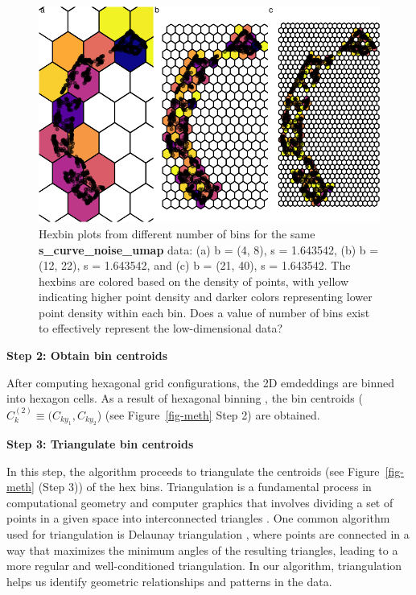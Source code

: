 \documentclass[
  12pt]{article}
\begin{document}
\begin{figure}[H]

{\centering \includegraphics{paper_files/figure-pdf/fig-binsize-1.pdf}

}

\caption{\label{fig-binsize}Hexbin plots from different number of bins
for the same \textbf{s\_curve\_noise\_umap} data: (a) b = (4, 8), s =
1.643542, (b) b = (12, 22), s = 1.643542, and (c) b = (21, 40), s =
1.643542. The hexbins are colored based on the density of points, with
yellow indicating higher point density and darker colors representing
lower point density within each bin. Does a value of number of bins
exist to effectively represent the low-dimensional data?}

\end{figure}

\textbf{Step 2: Obtain bin centroids}

After computing hexagonal grid configurations, the 2D emdeddings are
binned into hexagon cells. As a result of hexagonal binning , the bin
centroids (\(C_k^{(2)} \equiv (C_{ky_1}, C_{ky_2}\)) (see
Figure~\ref{fig-meth} Step 2) are obtained.

\textbf{Step 3: Triangulate bin centroids}

In this step, the algorithm proceeds to triangulate the centroids (see
Figure~\ref{fig-meth} (Step 3)) of the hex bins. Triangulation is a
fundamental process in computational geometry and computer graphics that
involves dividing a set of points in a given space into interconnected
triangles \citep{article30}. One common algorithm used for triangulation
is Delaunay triangulation \citep{article26}, where points are connected
in a way that maximizes the minimum angles of the resulting triangles,
leading to a more regular and well-conditioned triangulation. In our
algorithm, triangulation helps us identify geometric relationships and
patterns in the data.
\end{document}
